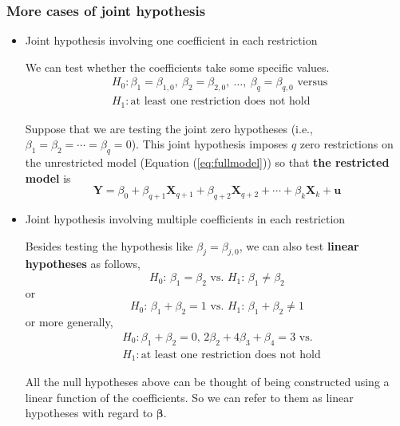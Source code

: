 \documentclass[a4paper,11pt]{article}
\begin{document}
\subsubsection*{More cases of joint hypothesis}
\label{sec:org0276614}

\begin{itemize}
\item Joint hypothesis involving one coefficient in each restriction
\label{sec:orgc8accb7}

We can test whether the coefficients take some specific values.
\begin{align*}
&H_0: \beta_1 = \beta_{1,0},\ \beta_2 = \beta_{2,0},\ \ldots,\ \beta_q = \beta_{q,0} \text{ versus } \\
&H_1: \text{at least one restriction does not hold}
\end{align*}

Suppose that we are testing the joint zero hypotheses (i.e., \(\beta_1
= \beta_2 = \cdots = \beta_q = 0\)). This joint hypothesis imposes \(q\)
zero restrictions on the unrestricted model (Equation
(\ref{eq:fullmodel})) so that \textbf{the restricted model} is
\begin{equation}
\label{eq:restmodel-2}
\mathbf{Y} = \beta_0 + \beta_{q+1} \mathbf{X}_{q+1} + \beta_{q+2} \mathbf{X}_{q+2} + \cdots + \beta_k \mathbf{X}_k + \mathbf{u}
\end{equation}

\item Joint hypothesis involving multiple coefficients in each restriction
\label{sec:org9f45f47}

Besides testing the hypothesis like \(\beta_j = \beta_{j,0}\), we can
also test \textbf{linear hypotheses} as follows,
\begin{equation*}
H_0:\, \beta_1 = \beta_2 \text{ vs. } H_1:\, \beta_1 \neq \beta_2
\end{equation*}
or
\begin{equation*}
H_0:\, \beta_1 + \beta_2 = 1 \text{ vs. } H_1:\, \beta_1 + \beta_2 \neq 1
\end{equation*}
or more generally,
\begin{align*}
&H_0: \beta_1 + \beta_2 = 0,\, 2\beta_2 + 4\beta_3 + \beta_4 = 3 \text{ vs. } \\
&H_1: \text{at least one restriction does not hold}
\end{align*}

All the null hypotheses above can be thought of being constructed
using a linear function of the coefficients. So we can refer to them
as linear hypotheses with regard to \(\boldsymbol{\beta}\).
\end{itemize}
\end{document}
